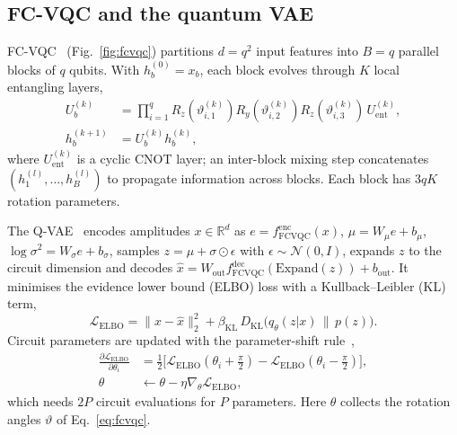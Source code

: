 \documentclass[conference]{IEEEtran}
\newcommand{\cL}{\mathcal{L}}
\begin{document}
\subsection{FC-VQC and the quantum VAE}
FC-VQC~\cite{su2026} (Fig.~\ref{fig:fcvqc}) partitions $d=q^2$ input features into $B=q$ parallel blocks of $q$ qubits. With $h^{(0)}_b=x_b$, each block evolves through $K$ local entangling layers,
\begin{equation}
\begin{aligned}
U^{(k)}_b&=\prod_{i=1}^{q}R_z(\vartheta^{(k)}_{i,1})R_y(\vartheta^{(k)}_{i,2})R_z(\vartheta^{(k)}_{i,3})\,U^{(k)}_{\mathrm{ent}},\\
h^{(k+1)}_b&=U^{(k)}_b h^{(k)}_b,
\end{aligned}
\label{eq:fcvqc}
\end{equation}
where $U^{(k)}_{\mathrm{ent}}$ is a cyclic CNOT layer; an inter-block mixing step concatenates $(h^{(l)}_1,\dots,h^{(l)}_B)$ to propagate information across blocks. Each block has $3qK$ rotation parameters.

The Q-VAE~\cite{kingma2014} encodes amplitudes $x\in\mathbb R^d$ as $e=f^{\mathrm{enc}}_{\mathrm{FCVQC}}(x)$, $\mu=W_\mu e+b_\mu$, $\log\sigma^2=W_\sigma e+b_\sigma$, samples $z=\mu+\sigma\odot\epsilon$ with $\epsilon\sim\mathcal N(0,I)$, expands $z$ to the circuit dimension and decodes $\hat x=W_{\mathrm{out}}f^{\mathrm{dec}}_{\mathrm{FCVQC}}(\mathrm{Expand}(z))+b_{\mathrm{out}}$. It minimises the evidence lower bound (ELBO) loss with a Kullback--Leibler (KL) term,
\begin{equation}
\cL_{\mathrm{ELBO}}=\|x-\hat x\|_2^2+\beta_{\mathrm{KL}}\,D_{\mathrm{KL}}\big(q_\theta(z|x)\,\|\,p(z)\big).
\label{eq:elbo}
\end{equation}
Circuit parameters are updated with the parameter-shift rule~\cite{mitarai2018,schuld2019},
\begin{equation}
\begin{aligned}
\frac{\partial\cL_{\mathrm{ELBO}}}{\partial\theta_i}&=\tfrac12\big[\cL_{\mathrm{ELBO}}(\theta_i+\tfrac{\pi}{2})-\cL_{\mathrm{ELBO}}(\theta_i-\tfrac{\pi}{2})\big],\\
\theta&\leftarrow\theta-\eta\nabla_\theta\cL_{\mathrm{ELBO}},
\end{aligned}
\label{eq:ps}
\end{equation}
which needs $2P$ circuit evaluations for $P$ parameters. Here $\theta$ collects the rotation angles $\vartheta$ of Eq.~\eqref{eq:fcvqc}.
\end{document}
